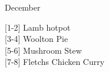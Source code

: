 		\begin{menu}{December}
    
    \begin{recipelist}
    
        {\scriptsize[1-2]} Lamb hotpot\\
        {\scriptsize[3-4]} Woolton Pie\\
        {\scriptsize[5-6]} Mushroom Stew\\
        {\scriptsize[7-8]} Fletchs Chicken Curry\\%
    \end{recipelist}%
    \begin{recipelist}
    
    \end{recipelist}\par%
  

\end{menu}
